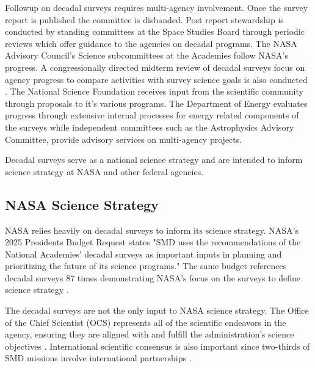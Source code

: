 \documentclass[preprint,12pt]{elsarticle}
\begin{document}
Followup on decadal surveys requires multi-agency involvement. Once the survey report is published the committee is disbanded. Post report stewardship is conducted by standing committees at the Space Studies Board through periodic reviews which offer guidance to the agencies on decadal programs. The NASA Advisory Council's Science subcommittees at the Academies follow NASA's progress. A congressionally directed midterm review of decadal surveys focus on agency progress to compare activities with survey science goals is also conducted \cite{congress2005nasa}. The National Science Foundation receives input from the scientific community through proposals to it's various programs. The Department of Energy evaluates progress through extensive internal processes for energy related components of the surveys while independent committees such as the Astrophysics Advisory Committee, provide advisory services on multi-agency projects.

Decadal surveys serve as a national science strategy and are intended to inform science strategy at NASA and other federal agencies. 

\subsection{NASA Science Strategy}
NASA relies heavily on decadal surveys to inform its science strategy. NASA's 2025 Presidents Budget Request states "SMD uses the recommendations of the National Academies' decadal surveys as important inputs in planning and prioritizing the future of its science programs." The same budget references decadal surveys 87 times demonstrating NASA's focus on the surveys to define science strategy \cite{NASA2025budget}. 

The decadal surveys are not the only input to NASA science strategy. The Office of the Chief Scientist (OCS) represents all of the scientific endeavors in the agency, ensuring they are aligned with and fulfill the administration's science objectives \cite{nasa_partnerships_2024}. International scientific consensus is also important since two-thirds of SMD missions involve international partnerships \cite{nasa_smd_hearing_2024}. 
 
\end{document}

